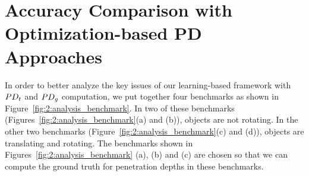 \section{Accuracy Comparison with Optimization-based PD Approaches}

In order to better analyze the key issues of our learning-based framework with $PD_t$ and $PD_g$ computation, we put together four benchmarks as shown in Figure~\ref{fig:2:analysis_benchmark}. In two of these benchmarks (Figures~\ref{fig:2:analysis_benchmark}(a) and (b)), objects are not rotating. In the other two benchmarks (Figure~\ref{fig:2:analysis_benchmark}(c) and (d)), objects are translating and rotating. The benchmarks shown in Figures~\ref{fig:2:analysis_benchmark} (a), (b) and (c) are chosen so that we can compute the ground truth for penetration depths in these benchmarks. 

